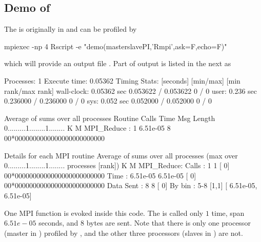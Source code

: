 \subsection{Demo of }

The  is originally in  and can be
profiled by
\begin{Code}
mpiexec -np 4 Rscript -e "demo(masterslavePI,'Rmpi',ask=F,echo=F)"
\end{Code}
which will provide an output file .
Part of output is listed in the next as
\begin{Output}
Processes:	1
Execute time:	0.05362
Timing Stats: [seconds]	[min/max]    	[min rank/max rank]
  wall-clock: 0.05362 sec	0.053622 / 0.053622	0 / 0
        user: 0.236 sec	0.236000 / 0.236000	0 / 0
         sys: 0.052 sec	0.052000 / 0.052000	0 / 0

                  Average of sums over all processes
Routine                 Calls       Time Msg Length    %
                                                    0.........1........1........
                                                              K        M
MPI_Reduce          :       1   6.51e-05          8 00*0000000000000000000000000

Details for each MPI routine
                  Average of sums over all processes
                                (max over          0.........1........1........
                                 processes [rank])           K        M
MPI_Reduce:
	Calls     :          1            1 [   0] 00*0000000000000000000000000
	Time      :   6.51e-05     6.51e-05 [   0] 00*0000000000000000000000000
	Data Sent :          8            8 [   0]
	By bin    : 5-8	[1,1]	[  6.51e-05,  6.51e-05]
\end{Output}
One MPI  function  is
evoked inside this  code. The  is called only $1$
time, span $6.51e-05$ seconds, and 8 bytes are sent.
Note that there is only one processor (master in )
profiled by , and the other three processors
(slaves in ) are not.
